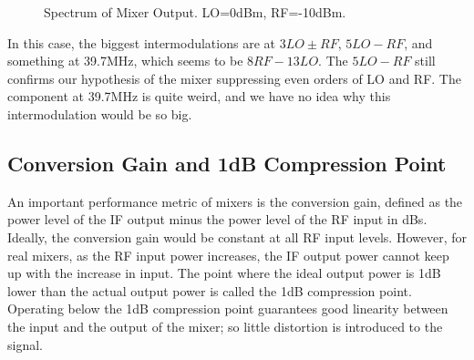 \documentclass{article}
\begin{document}
\begin{figure}[h]
    \centering
    \caption{Spectrum of Mixer Output. LO=0dBm, RF=-10dBm.}
    \label{fig:mixer_out_2}
\end{figure}

In this case, the biggest intermodulations are at $3LO\pm RF$, $5LO-RF$, and something at 39.7MHz, which seems to be $8RF-13LO$.
The $5LO-RF$ still confirms our hypothesis of the mixer suppressing even orders of LO and RF.
The component at 39.7MHz is quite weird, and we have no idea why this intermodulation would be so big.

\subsection{Conversion Gain and 1dB Compression Point}
An important performance metric of mixers is the conversion gain, defined as the power level of the IF output minus the power level of the RF input in dBs.
Ideally, the conversion gain would be constant at all RF input levels.
However, for real mixers, as the RF input power increases, the IF output power cannot keep up with the increase in input.
The point where the ideal output power is 1dB lower than the actual output power is called the 1dB compression point.
Operating below the 1dB compression point guarantees good linearity between the input and the output of the mixer;
so little distortion is introduced to the signal.
\end{document}
